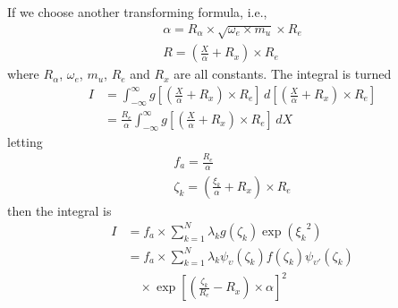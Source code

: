 \documentclass[aps,pra,groupedaddress,
                amsfonts,amssymb,
                preprint
    ]{revtex4}
\newcommand{\molnwv}{\psi}
\newcommand{\vibqu}{\upsilon}
\begin{document}
If we choose another transforming formula, i.e.,
\begin{gather}
\alpha = R_\alpha\times \sqrt{\omega_e\times m_u}\times R_e \\
R = \left(\frac{X}{\alpha}+R_x\right)\times R_e
\end{gather}
where $R_\alpha$, $\omega_e$, $m_u$, $R_e$ and $R_x$ are all constants.
The integral is turned
\begin{equation}
\begin{split}
I &=\int_{-\infty}^{\infty}g\left[\left(\frac{X}{\alpha}+R_x\right)\times
  R_e\right]\,d\left[\left(\frac{X}{\alpha}+R_x\right)\times R_e\right] \\
&=\frac{R_e}{\alpha}\int_{-\infty}^{\infty}g\left[\left(\frac{X}{\alpha}+R_x\right)\times
  R_e\right]\,dX
\end{split}
\end{equation}
letting
\begin{gather}
f_a = \frac{R_e}{\alpha} \\
\zeta_k = \left(\frac{\xi_k}{\alpha}+R_x\right)\times R_e
\end{gather}
then the integral is
\begin{equation}
\begin{split}
I &=
f_a\times\sum_{k=1}^{N}\lambda_kg(\zeta_k)\exp\left({\xi_k}^2\right)
\\
&=
f_a\times\sum_{k=1}^{N}\lambda_k\molnwv_{\vibqu}(\zeta_k)f(\zeta_k)\molnwv_{\vibqu'}(\zeta_k) \\
&\quad\times\exp\left[\left(\frac{\zeta_k}{R_e}-R_x\right)\times \alpha\right]^2
\end{split}
\end{equation}
\end{document}
